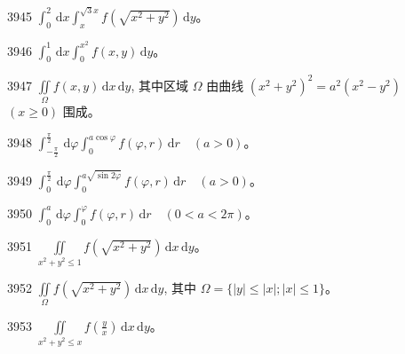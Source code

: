 \begin{prob}[S]{3945}
$\int_{0}^{2}\,\mathrm{d}x \int_{x}^{\sqrt{3}x} f(\sqrt{x^2 + y^2})\,\mathrm{d}y$。
\end{prob}

\begin{prob}[S]{3946}
$\int_{0}^{1}\,\mathrm{d}x \int_{0}^{x^2} f(x, y)\,\mathrm{d}y$。
\end{prob}

\begin{prob}[M]{3947}
$\iint\limits_{\Omega} f(x, y)\,\mathrm{d}x\,\mathrm{d}y$, 其中区域 $\Omega$ 由曲线 $(x^2 + y^2)^2 = a^2(x^2 - y^2)$ $(x \geqslant 0)$ 围成。
\end{prob}


\begin{prob}[S]{3948}
$\int_{-\frac{\pi}{2}}^{\frac{\pi}{2}}\,\mathrm{d}\varphi \int_{0}^{a\cos\varphi} f(\varphi, r)\,\mathrm{d}r \quad (a > 0)$。
\end{prob}

\begin{prob}[S]{3949}
$\int_{0}^{\frac{\pi}{2}}\,\mathrm{d}\varphi \int_{0}^{a\sqrt{\sin 2\varphi}} f(\varphi, r)\,\mathrm{d}r \quad (a > 0)$。
\end{prob}

\begin{prob}[S]{3950}
$\int_{0}^{a}\,\mathrm{d}\varphi \int_{0}^{\varphi} f(\varphi, r)\,\mathrm{d}r \quad (0 < a < 2\pi)$。
\end{prob}


\begin{prob}[S]{3951}
$\iint\limits_{x^2 + y^2 \leqslant 1} f(\sqrt{x^2 + y^2})\,\mathrm{d}x\,\mathrm{d}y$。
\end{prob}

\begin{prob}[S]{3952}
$\iint\limits_{\Omega} f(\sqrt{x^2 + y^2})\,\mathrm{d}x\,\mathrm{d}y$, 其中 $\Omega = \{|y| \leqslant |x|; |x| \leqslant 1\}$。
\end{prob}

\begin{prob}[S]{3953}
$\iint\limits_{x^2 + y^2 \leqslant x} f\left(\frac{y}{x}\right)\,\mathrm{d}x\,\mathrm{d}y$。
\end{prob}


